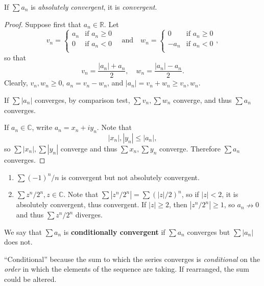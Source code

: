 \begin{theorem}\label{thm:absolute convergence -> convergence}
    If $ \sum a_n $ is \textit{absolutely convergent}, it is \textit{convergent}.
\end{theorem}
\begin{proof}
    Suppose first that $ a_n\in \mathbb{R} $. Let 
    \[
        v_n = \begin{cases}
        a_n &\text{if }a_n\ge 0\\
        0 &\text{if }a_n<0\\
        \end{cases} \quad \text{and}\quad w_n = \begin{cases}
            0 &\text{if }a_n\ge 0\\
            -a_n &\text{if }a_n<0\\
        \end{cases},
    \]
    so that 
    \[
        v_n = \frac{|a_n|+a_n}{2},\quad w_n = \frac{|a_n|-a_n}{2}.
    \]
    Clearly, $ v_n,w_n\ge 0 $, $ a_n = v_n-w_n $, and $ |a_n|=v_n+w_n\ge v_n,w_n $.

    If $ \sum |a_n| $ converges, by comparison test, $ \sum v_n,\sum w_n $ converge, and thus $ \sum a_n $ converges.

    If $ a_n\in \mathbb{C}  $, write $ a_n = x_n+ i y_n $. Note that 
    \[
        |x_n|,|y_n|\le |a_n|,
    \]
    so $ \sum |x_n|,\sum |y_n| $ converge and thus $ \sum x_n,\sum y_n $ converge. Therefore $ \sum a_n $ converges.
\end{proof}

\begin{example}
    \begin{enumerate}
        \item $ \sum (-1)^n/n $ is convergent but not absolutely convergent.
        \item $ \sum z^n/2^n, z\in \mathbb{C} $. Note that $ \sum |z^n/2^n| = \sum (|z|/2)^n $, so if $ |z|<2 $, it is absolutely convergent, thus convergent. If $ |z|\ge 2 $, then $ |z^n/2^n|\ge 1 $, so $ a_n \nrightarrow 0 $ and thus $\sum z^n/2^n$ diverges.
    \end{enumerate}
\end{example}

\begin{definition}
    We say that $ \sum a_n $ is \textbf{conditionally convergent} if $ \sum a_n $ converges but $ \sum |a_n| $ does not.
\end{definition}
\begin{note}
``Conditional'' because the sum to which the series converges is \textit{conditional} on the \textit{order} in which the elements of the sequence are taking. If rearranged, the sum could be altered.
\end{note}

